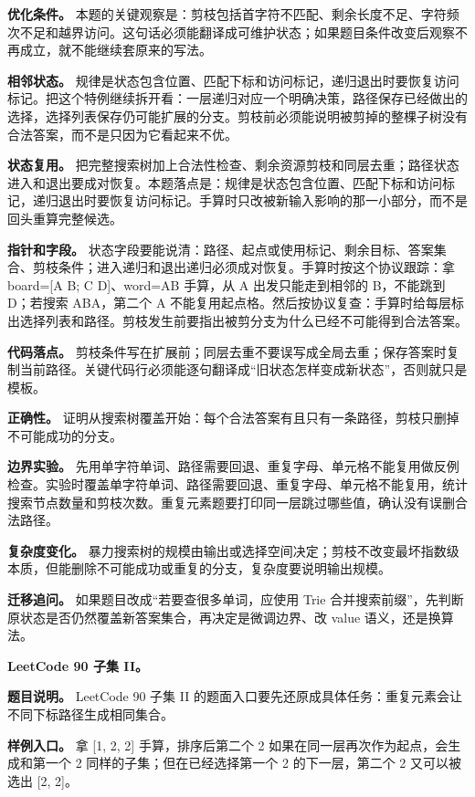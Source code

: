 \textbf{优化条件。} 本题的关键观察是：剪枝包括首字符不匹配、剩余长度不足、字符频次不足和越界访问。这句话必须能翻译成可维护状态；如果题目条件改变后观察不再成立，就不能继续套原来的写法。

\textbf{相邻状态。} 规律是状态包含位置、匹配下标和访问标记，递归退出时要恢复访问标记。把这个特例继续拆开看：一层递归对应一个明确决策，路径保存已经做出的选择，选择列表保存仍可能扩展的分支。剪枝前必须能说明被剪掉的整棵子树没有合法答案，而不是只因为它看起来不优。

\textbf{状态复用。} 把完整搜索树加上合法性检查、剩余资源剪枝和同层去重；路径状态进入和退出要成对恢复。本题落点是：规律是状态包含位置、匹配下标和访问标记，递归退出时要恢复访问标记。手算时只改被新输入影响的那一小部分，而不是回头重算完整候选。

\textbf{指针和字段。} 状态字段要能说清：路径、起点或使用标记、剩余目标、答案集合、剪枝条件；进入递归和退出递归必须成对恢复。手算时按这个协议跟踪：拿 board=[A B; C D]、word=AB 手算，从 A 出发只能走到相邻的 B，不能跳到 D；若搜索 ABA，第二个 A 不能复用起点格。然后按协议复查：手算时给每层标出选择列表和路径。剪枝发生前要指出被剪分支为什么已经不可能得到合法答案。

\textbf{代码落点。} 剪枝条件写在扩展前；同层去重不要误写成全局去重；保存答案时复制当前路径。关键代码行必须能逐句翻译成“旧状态怎样变成新状态”，否则就只是模板。

\textbf{正确性。} 证明从搜索树覆盖开始：每个合法答案有且只有一条路径，剪枝只删掉不可能成功的分支。

\textbf{边界实验。} 先用单字符单词、路径需要回退、重复字母、单元格不能复用做反例检查。实验时覆盖单字符单词、路径需要回退、重复字母、单元格不能复用，统计搜索节点数量和剪枝次数。重复元素题要打印同一层跳过哪些值，确认没有误删合法路径。

\textbf{复杂度变化。} 暴力搜索树的规模由输出或选择空间决定；剪枝不改变最坏指数级本质，但能删除不可能成功或重复的分支，复杂度要说明输出规模。

\textbf{迁移追问。} 如果题目改成“若要查很多单词，应使用 Trie 合并搜索前缀”，先判断原状态是否仍然覆盖新答案集合，再决定是微调边界、改 value 语义，还是换算法。

\noindent\textbf{LeetCode 90 子集 II。}

\textbf{题目说明。} LeetCode 90 子集 II 的题面入口要先还原成具体任务：重复元素会让不同下标路径生成相同集合。

\textbf{样例入口。} 拿 [1, 2, 2] 手算，排序后第二个 2 如果在同一层再次作为起点，会生成和第一个 2 同样的子集；但在已经选择第一个 2 的下一层，第二个 2 又可以被选出 [2, 2]。

